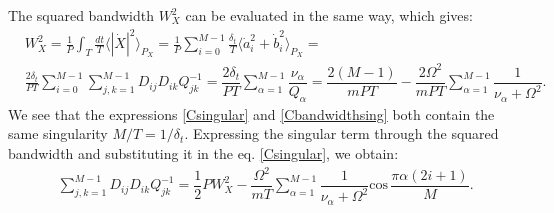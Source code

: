 \documentclass{article}
\begin{document}
The squared bandwidth $W_{X}^{2}$ can be evaluated in the same way, which gives:
\begin{align}\label{Cbandwidthsing}
    &W_{X}^{2} = \frac{1}{P}\int_{T} \frac{dt}{T} \langle |\dot{X}|^{2} \rangle_{P_{X}} = \frac{1}{P} \sum_{i=0}^{M-1}\frac{\delta_{t}}{T} \langle \dot{a}^{2}_{i} + \dot{b}^{2}_{i}\rangle_{P_{X}} = \nonumber \\
    &\frac{2\delta_{t}}{PT}\sum_{i=0}^{M-1}\sum_{j,k=1}^{M-1}D_{ij}D_{ik}Q^{-1}_{jk} =  \dfrac{2\delta_{t}}{PT}\sum_{\alpha=1}^{M-1}\dfrac{\nu_{\alpha}}{Q_{\alpha}} = \dfrac{2(M-1)}{mPT} - \dfrac{2\Omega^{2}}{mPT}\sum_{\alpha=1}^{M-1}\dfrac{1}{\nu_{\alpha}+\Omega^{2}}.
\end{align}
We see that the expressions \eqref{Csingular} and \eqref{Cbandwidthsing} both contain the same singularity $M/T = 1/\delta_{t}  $. Expressing the singular term through the squared bandwidth and substituting it in the eq$.$ \eqref{Csingular}, we obtain:
\begin{align}\label{Csingularremoved}
    &\sum_{j,k=1}^{M-1} D_{ij}D_{ik}Q_{jk}^{-1} = \dfrac{1}{2}PW_{X}^{2} - \dfrac{\Omega^{2}}{mT}\sum_{\alpha=1}^{M-1}\dfrac{1}{\nu_{\alpha}+\Omega^{2}}\textrm{cos}\,\dfrac{\pi \alpha(2i+1)}{M}.
\end{align}
\end{document}

